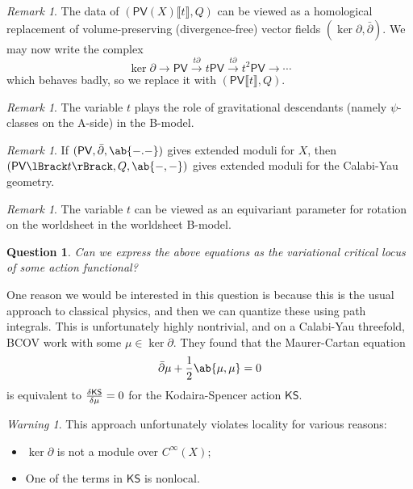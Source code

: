 \documentclass{amsart}
\newtheorem{quest}[thm]{Question}
\theoremstyle{definition}
\theoremstyle{remark}
\newtheorem{rmk}[thm]{Remark}
\newtheorem{warn}[thm]{Warning}
\theoremstyle{plain}
\theoremstyle{definition}
\theoremstyle{remark}
\newcommand{\ms}[1]{\mathsf{#1}}
\newcommand{\1}{\mathbf{1}}
\newcommand{\2}{\mathbf{2}}
\newcommand{\3}{\mathbf{3}}
\newcommand{\ps}[1]{\lBrack #1 \rBrack}
\newcommand{\dbar}{\bar{\partial}}
\begin{document}
\begin{rmk}
    The data of \((\ms{PV}(X) \ps{t}, Q)\) can be viewed as a homological replacement of volume-preserving (divergence-free) vector fields \((\ker \partial, \dbar)\). We may now write the complex
    \[ \ker \partial \to \ms{PV} \xrightarrow{t \partial} t \ms{PV} \xrightarrow{t \partial} t^2 \ms{PV} \to \cdots \]
    which behaves badly, so we replace it with \((\ms{PV} \ps{t}, Q)\).
\end{rmk}

\begin{rmk}
    The variable \(t\) plays the role of gravitational descendants (namely \(\psi\)-classes on the A-side) in the B-model.
\end{rmk}

\begin{rmk}
    If \((\ms{PV}, \dbar, \ab\{-.-\})\) gives extended moduli for \(X\), then \((\ms{PV} \ps{t}, Q, \ab\{-,-\})\) gives extended moduli for the Calabi-Yau geometry.
\end{rmk}

\begin{rmk}
    The variable \(t\) can be viewed as an equivariant parameter for rotation on the worldsheet in the worldsheet B-model.
\end{rmk}

\begin{quest}
    Can we express the above equations as the variational critical locus of some action functional?
\end{quest}

One reason we would be interested in this question is because this is the usual approach to classical physics, and then we can quantize these using path integrals. This is unfortunately highly nontrivial, and on a Calabi-Yau threefold, BCOV work with some \(\mu \in \ker \partial\). They found that the Maurer-Cartan equation
\[ \dbar \mu + \frac{1}{2} \ab\{\mu, \mu\} = 0 \]
is equivalent to \(\fdv{\ms{KS}}{\mu} = 0\) for the Kodaira-Spencer action \(\ms{KS}\).

\begin{warn}
    This approach unfortunately violates locality for various reasons:
    \begin{itemize}
        \item \(\ker \partial\) is not a module over \(C^{\infty}(X)\);
        \item One of the terms in \(\ms{KS}\) is nonlocal.
    \end{itemize}
\end{warn}
\end{document}
